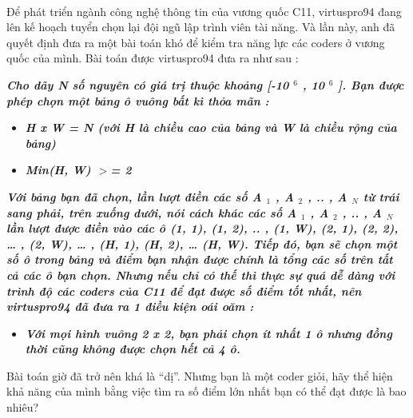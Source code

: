  

Để phát triển ngành công nghệ thông tin của vương quốc C11, virtuspro94 đang lên kế hoạch tuyển chọn lại đội ngũ lập trình viên tài năng. Và lần này, anh đã quyết định đưa ra một bài toán khó để kiểm tra năng lực các coders ở vương quốc của mình. Bài toán được virtuspro94 đưa ra như sau :

\emph{\textbf{Cho dãy N số nguyên có giá trị thuộc khoảng [-10 $^ 6 $ , 10 $^ 6 $ ]. Bạn được phép chọn một bảng ô vuông bất kì thỏa mãn : }}
\begin{itemize}
	\item \emph{\textbf{H x W = N (với H là chiều cao của bảng và W là chiều rộng của bảng) }}
	\item \emph{\textbf{Min(H, W) $>$= 2 }}
\end{itemize}

\emph{\textbf{Với bảng bạn đã chọn, lần lượt điền các số A $_ 1 $ , A $_ 2 $ , .. , A $_ N $ từ trái sang phải, trên xuống dưới, nói cách khác các số A $_ 1 $ , A $_ 2 $ , .. , A $_ N $ lần lượt được điền vào các ô (1, 1), (1, 2), .. , (1, W), (2, 1), (2, 2), … , (2, W), … , (H, 1), (H, 2), … (H, W). Tiếp đó, bạn sẽ chọn một số ô trong bảng và điểm bạn nhận được chính là tổng các số trên tất cả các ô bạn chọn. Nhưng nếu chỉ có thế thì thực sự quá dễ dàng với trình độ các coders của C11 để đạt được số điểm tốt nhất, nên virtuspro94 đã đưa ra 1 điều kiện oái oăm : }}
\begin{itemize}
	\item \emph{\textbf{Với mọi hình vuông 2 x 2, bạn phải chọn ít nhất 1 ô nhưng đồng thời cũng không được chọn hết cả 4 ô. }}
\end{itemize}

Bài toán giờ đã trở nên khá là “dị”. Nhưng bạn là một coder giỏi, hãy thể hiện khả năng của mình bằng việc tìm ra số điểm lớn nhất bạn có thể đạt được là bao nhiêu?

\